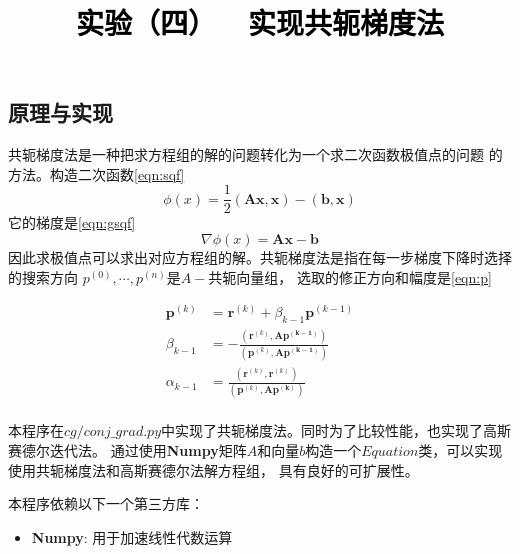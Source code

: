 \documentclass[a4paper,twoside]{article}
\newcommand{\PaperTitle}{实验（四）\ \ 实现共轭梯度法}  %
\begin{document}
\newpage

\title{
	\Large{\textcolor{black}{\PaperTitle}}
}
	
	
\maketitle
	
\tableofcontents
 
\newpage
\setcounter{page}{1}

\begin{spacing}{1.2}

\section{原理与实现}

共轭梯度法是一种把求方程组的解的问题转化为一个求二次函数极值点的问题
的方法。构造二次函数\eqref{eqn:sqf}
\begin{equation}
	\label{eqn:sqf}
	\phi (x)=\frac{1}{2}(\mathbf{Ax},\mathbf{x})-(\mathbf{b},\mathbf{x})
\end{equation}
它的梯度是\eqref{eqn:gsqf}
\begin{equation}
	\label{eqn:gsqf}
	\nabla \phi (x)=\mathbf{Ax}-\mathbf{b}
\end{equation}
因此求极值点可以求出对应方程组的解。共轭梯度法是指在每一步梯度下降时选择的搜索方向
$p^{(0)},\cdots,p^{(n)}$是$A-$共轭向量组，
选取的修正方向和幅度是\eqref{eqn:p}

\begin{equation}
	\label{eqn:p}
	\begin{aligned}
	\mathbf{p}^{(k)}&=\mathbf{r}^{(k)}+\beta_{k-1}\mathbf{p}^{(k-1)}\\
	\beta_{k-1}&=-\frac{(\mathbf{r}^{(k)},\mathbf{Ap^{(k-1)}})}{(\mathbf{p}^{(k)},\mathbf{Ap^{(k-1)}})} \\
	\alpha_{k-1}&=\frac{(\mathbf{r}^{(k)},\mathbf{r}^{(k)})}{(\mathbf{p}^{(k)},\mathbf{Ap^{(k)}})} \\
	\end{aligned}
\end{equation}

本程序在$cg/conj\_grad.py$中实现了共轭梯度法。同时为了比较性能，也实现了高斯赛德尔迭代法。
通过使用\textbf{Numpy}矩阵$A$和向量$b$构造一个$Equation$类，可以实现使用共轭梯度法和高斯赛德尔法解方程组，
具有良好的可扩展性。

本程序依赖以下一个第三方库：
\begin{itemize}
	\item \textbf{Numpy}: 用于加速线性代数运算
\end{itemize}


\end{spacing}
\end{document}
